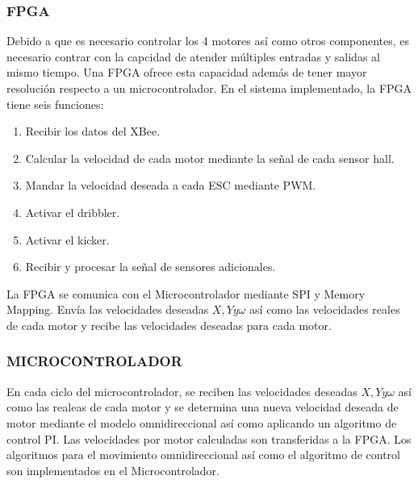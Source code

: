 \documentclass[twocolumn,10pt]{amrob}
\begin{document}
\subsubsection*{FPGA}
Debido a que es necesario controlar los 4 motores así como otros componentes, es necesario contrar con la capcidad de atender múltiples entradas y salidas al mismo tiempo. Una FPGA ofrece esta capacidad además de tener mayor resolución respecto a un microcontrolador. En el sistema implementado, la FPGA tiene seis funciones:
\begin{enumerate}
  \item Recibir los datos del XBee.
  \item Calcular la velocidad de cada motor mediante la señal de cada sensor hall.
  \item Mandar la velocidad deseada a cada ESC mediante PWM.
  \item Activar el dribbler.
  \item Activar el kicker.
  \item Recibir y procesar la señal de sensores adicionales.
\end{enumerate}
La FPGA se comunica con el Microcontrolador mediante SPI y Memory Mapping. Envía las velocidades deseadas \(X, Y y \omega\) así como las velocidades reales de cada motor y recibe las velocidades deseadas para cada motor.\par

\subsubsection*{MICROCONTROLADOR}
En cada ciclo del microcontrolador, se reciben las velocidades deseadas \(X, Y y \omega\) así como las realeas de cada motor y se determina una nueva velocidad deseada de motor mediante el modelo omnidireccional así como aplicando un algoritmo de control PI. Las velocidades por motor calculadas son transferidas a la FPGA. Los algoritmos para el movimiento omnidireccional así como el algoritmo de control son implementados en el Microcontrolador.

\end{document}
